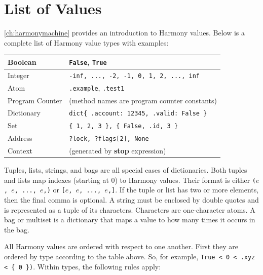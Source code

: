 \documentclass{report}
\begin{document}



\appendix

\chapter{List of Values}
\label{ap:values}

\autoref{ch:harmonymachine} provides an introduction to Harmony values.
Below is a complete list of Harmony value types with examples:

\vspace{1em}
\begin{tabular}{|l|l|}
\hline
Boolean & \texttt{False}, \texttt{True} \\
\hline
Integer & \texttt{-inf, ..., -2, -1, 0, 1, 2, ..., inf} \\
\hline
Atom & \texttt{.example}, \texttt{.test1} \\
\hline
Program Counter & (method names are program counter constants) \\
\hline
Dictionary & \texttt{dict\{ .account: 12345, .valid: False \} } \\
\hline
Set & \texttt{\{ 1, 2, 3 \}, \{ False, .id, 3 \} } \\
\hline
Address & \texttt{?lock, ?flags[2], None} \\
\hline
Context & (generated by \textbf{stop} expression) \\
\hline
\end{tabular}
\vspace{1em}

Tuples, lists, strings, and bags are all special cases of dictionaries.
Both tuples and lists map indexes (starting at 0) to Harmony values.
Their format is either \texttt{($e$, $e$, ..., $e$,)} or
\texttt{[$e$, $e$, ..., $e$,]}.
If the tuple or list has two or more elements, then the final comma
is optional.
A string must be enclosed by double quotes and is represented as
a tuple of its characters.  Characters are one-character atoms.
A bag or multiset is a dictionary that maps a value to how many
times it occurs in the bag.

All Harmony values are ordered with respect to one another.  First they
are ordered by type according to the table above.
So, for example, \texttt{\texttt{True} < 0 < .xyz < \{ 0 \})}.
Within types, the following rules apply:
\end{document}
